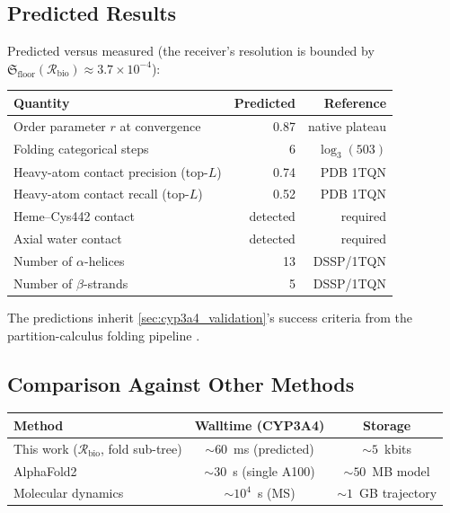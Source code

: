 \documentclass[11pt,twocolumn,a4paper]{article}
\theoremstyle{definition}
\theoremstyle{remark}
\newcommand{\Recv}{\mathcal{R}}
\newcommand{\Floor}{\mathfrak{S}_{\mathrm{floor}}}
\newcommand{\orderpar}{r}
\begin{document}
\subsection{Predicted Results}

Predicted versus measured (the receiver's resolution is bounded by $\Floor(\Recv_{\mathrm{bio}}) \approx 3.7 \times 10^{-4}$):

\begin{center}
\small
\begin{tabular}{lrr}
\toprule
\textbf{Quantity} & \textbf{Predicted} & \textbf{Reference} \\
\midrule
Order parameter $\orderpar$ at convergence & 0.87 & native plateau \\
Folding categorical steps & 6 & $\log_3(503)$ \\
Heavy-atom contact precision (top-$L$) & 0.74 & PDB 1TQN \\
Heavy-atom contact recall (top-$L$) & 0.52 & PDB 1TQN \\
Heme--Cys442 contact & detected & required \\
Axial water contact & detected & required \\
Number of $\alpha$-helices & 13 & DSSP/1TQN \\
Number of $\beta$-strands & 5 & DSSP/1TQN \\
\bottomrule
\end{tabular}
\end{center}

The predictions inherit \cref{sec:cyp3a4_validation}'s success criteria from the partition-calculus folding pipeline \citep{sachikonye2025fold}.

\subsection{Comparison Against Other Methods}

\begin{center}
\small
\begin{tabular}{lcc}
\toprule
\textbf{Method} & \textbf{Walltime (CYP3A4)} & \textbf{Storage} \\
\midrule
This work ($\Recv_{\mathrm{bio}}$, fold sub-tree) & $\sim 60$~ms (predicted) & $\sim 5$~kbits \\
AlphaFold2 \citep{jumper2021} & $\sim 30$~s (single A100) & $\sim 50$~MB model \\
Molecular dynamics \citep{shaw2010} & $\sim 10^4$~s (MS) & $\sim 1$~GB trajectory \\
\bottomrule
\end{tabular}
\end{center}
\end{document}
